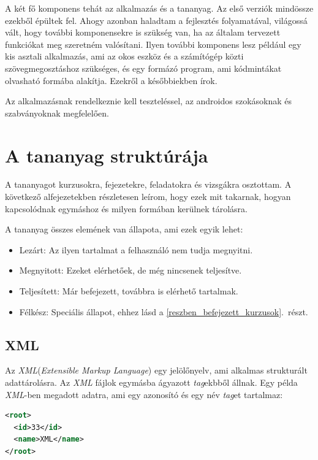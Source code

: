 \documentclass[12pt,a4paper]{article}
\newcommand{\xml}{\textit{XML}\xspace}
\begin{document}
	A két fő komponens tehát az alkalmazás és a tananyag. Az első verziók mindössze ezekből épültek fel. Ahogy azonban haladtam a fejlesztés folyamatával, világossá vált, hogy további komponensekre is szükség van, ha az általam tervezett funkciókat meg szeretném valósítani. Ilyen további komponens lesz például egy kis asztali alkalmazás, ami az okos eszköz és a számítógép közti szövegmegosztáshoz szükséges, és egy formázó program, ami kódmintákat olvasható formába alakítja. Ezekről a későbbiekben írok.
	
	Az alkalmazásnak rendelkeznie kell teszteléssel, az androidos szokásoknak és szabványoknak megfelelően.
	
	\section{A tananyag struktúrája}  
	
	A tananyagot kurzusokra, fejezetekre, feladatokra és vizsgákra osztottam. A következő alfejezetekben részletesen leírom, hogy ezek mit takarnak, hogyan kapcsolódnak egymáshoz és milyen formában kerülnek tárolásra.
	
	A tananyag összes elemének van állapota, ami ezek egyik lehet:
	
	\begin{itemize}
		\item Lezárt: Az ilyen tartalmat a felhasználó nem tudja megnyitni. 
		\item Megnyitott: Ezeket elérhetőek, de még nincsenek teljesítve.
		\item Teljesített: Már befejezett, továbbra is elérhető tartalmak.
		\item Félkész: Speciális állapot, ehhez lásd a \ref{reszben_befejezett_kurzusok}.\ részt.
	\end{itemize}
		
	\subsection{XML}
	
	Az \xml (\textit{Extensible Markup Language}) egy jelölőnyelv, ami alkalmas strukturált adattárolásra. Az \xml fájlok egymásba ágyazott \textit{tag}ekbből állnak. Egy példa \xml-ben megadott adatra, ami egy azonosító és egy név \textit{tag}et tartalmaz:
	
	\bigskip
	\begin{lstlisting}[language=XML]
<root>
  <id>33</id>
  <name>XML</name>
</root>
	\end{lstlisting}
	\bigskip
	
\end{document}
